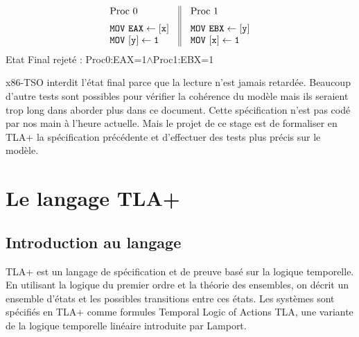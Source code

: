 \documentclass[12pt,a4paper]{article}
\begin{document}
\begin{center}
\[
\begin{array}{c||c}
  \begin{array}{l}
  	\vspace{0.2cm}
    \text{Proc 0} \hspace{1.0cm}\\
    \mathtt{MOV \text{ } EAX \leftarrow [x]} \\
    \mathtt{MOV \text{ } [y] \leftarrow 1} \\
  \end{array}&
  \begin{array}{l}
  \vspace{0.2cm}
   \text{Proc 1} \\
    \mathtt{MOV \text{ } EBX \leftarrow [y]} \\
    \mathtt{MOV \text{ } [x] \leftarrow 1} \\
  \end{array}
\end{array}
\]
Etat Final rejeté : Proc0:EAX=1$\land$Proc1:EBX=1
\end{center}  

x86-TSO interdit l'état final parce que la lecture n'est jamais retardée.
Beaucoup d'autre tests sont possibles pour vérifier la cohérence du modèle mais ils seraient trop long dans aborder plus dans ce document. Cette spécification n'est pas codé par nos main à l'heure actuelle. Mais le projet de ce stage est de formaliser en TLA+ la spécification précédente et d'effectuer des tests plus précis sur le modèle.

\section{Le langage TLA+}

\subsection{Introduction au langage}

TLA+ est un langage de spécification et de preuve basé sur la logique temporelle. En utilisant la logique du premier ordre et la théorie des ensembles, on décrit un ensemble d'états et les possibles transitions entre ces états. Les systèmes sont spécifiés en TLA+ comme formules Temporal Logic
of Actions TLA, une variante de la logique temporelle linéaire introduite par Lamport.
\end{document}
